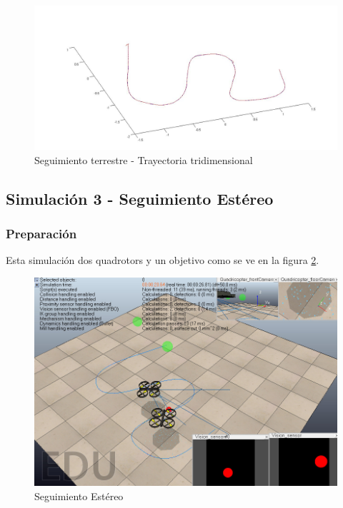 \begin{figure}[h]
\centering
\includegraphics[width=0.9\linewidth]{../Images/c3/sim2_traj_both_3d}
\caption{Seguimiento terrestre - Trayectoria tridimensional}
\label{fig:sim2_traj_both_3d}
\end{figure}




\subsection{Simulaci\'on 3 - Seguimiento Est\'ereo}
\subsubsection{Preparaci\'on}
Esta simulaci\'on dos quadrotors y un objetivo como se ve en la figura \ref{fig:sim3_set_up}.

\begin{figure}[htp]
	\centering
	\includegraphics[width=0.4\linewidth]{../Images/c3/sim3_set_up}
	\caption{Seguimiento Est\'ereo}
	\label{fig:sim3_set_up}
\end{figure}



